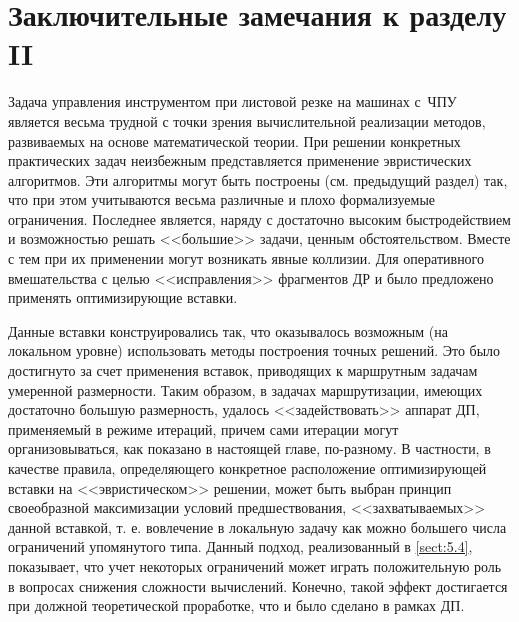 
\clearpage
\section*{
  Заключительные замечания к разделу II
}

Задача управления инструментом при листовой резке на машинах с~ЧПУ
является весьма трудной с точки зрения вычислительной реализации методов,
развиваемых на основе математической теории.
При решении конкретных практических задач неизбежным
представляется применение эвристических алгоритмов.
Эти алгоритмы могут быть построены
(см. предыдущий раздел)
так, что при этом учитываются весьма различные
и плохо формализуемые ограничения.
Последнее является, наряду с достаточно высоким
быстродействием и возможностью решать <<большие>> задачи,
ценным обстоятельством.
Вместе с тем при их применении могут возникать явные коллизии.
Для оперативного
вмешательства с целью <<исправления>> фрагментов ДР
и было предложено применять оптимизирующие вставки.

Данные вставки конструировались так,
что оказывалось возможным
(на локальном уровне)
использовать методы построения точных решений.
Это было достигнуто за счет применения вставок,
приводящих к маршрутным задачам умеренной размерности.
Таким образом, в задачах маршрутизации,
имеющих достаточно большую размерность,
удалось <<задействовать>> аппарат ДП, применяемый в режиме итераций,
причем сами итерации могут организовываться,
как показано в настоящей главе, по-разному.
В частности, в качестве правила,
определяющего конкретное расположение оптимизирующей вставки на
<<эвристическом>> решении,
может быть выбран принцип своеобразной максимизации условий предшествования,
<<захватываемых>> данной вставкой,
т. е. вовлечение в локальную задачу
как можно большего числа ограничений упомянутого типа.
Данный подход, реализованный
в \ref{sect:5.4},
показывает,
что учет некоторых ограничений может играть положительную роль
в вопросах снижения сложности вычислений.
Конечно, такой эффект достигается при должной
теоретической проработке,
что и было сделано в рамках ДП.
